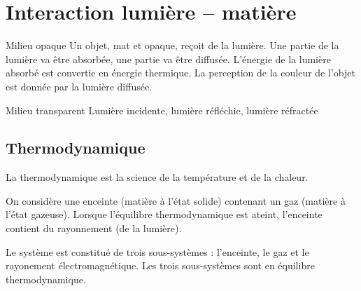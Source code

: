 \section{Interaction lumière -- matière}

{Milieu opaque}
Un objet, mat et opaque, reçoit de la lumière. Une partie de la lumière va être absorbée, une partie va être  diffusée. L'énergie de la lumière absorbé est convertie en énergie thermique. La perception de la couleur de l'objet est donnée par la lumière diffusée.



{Milieu transparent}
Lumière incidente, lumière réfléchie, lumière réfractée

\begin{center}
\end{center}

\subsection{Thermodynamique}
La thermodynamique est la science de la température et de la chaleur.


On considère une enceinte (matière à l'état solide) contenant un gaz (matière à l'état gazeuse). Lorsque l'équilibre thermodynamique est ateint, l'enceinte contient du rayonnement (de la lumière).

Le système est constitué de trois sous-systèmes : l'enceinte, le gaz et le rayonement électromagnétique. Les trois sous-systèmes sont en équilibre thermodynamique.
\subsection{}


